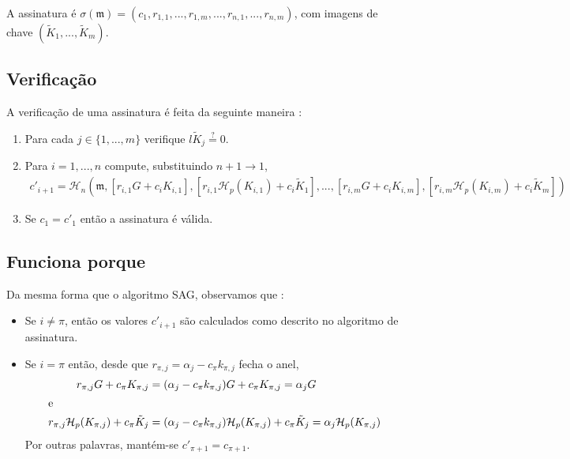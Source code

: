 \begin{description}
A assinatura é \(\sigma(\mathfrak{m}) = (c_1, r_{1, 1}, ..., r_{1, m}, ..., r_{n, 1}, ..., r_{n, m}) \), com imagens de chave $(\tilde{K}_1, ...,  \tilde{K}_m)$.



\subsection*{Verificação}

A verificação de uma assinatura é feita da seguinte maneira :

\begin{enumerate}
    \item Para cada $j \in \{1,...,m\}$ verifique $l \tilde{K}_j \stackrel{?}{=} 0$.
	\item Para \(i = 1, ..., n\) compute, substituindo \(n + 1 \rightarrow 1\),\vspace{.175cm}
	\begin{align*}
	c'_{i+1} = \mathcal{H}_n(\mathfrak{m}, [r_{i, 1} G + c_i K_{i, 1}], [r_{i, 1} \mathcal{H}_p(K_{i, 1}) + c_i \tilde{K}_1], 
	..., [r_{i, m} G + c_i K_{i, m}], [r_{i, m} \mathcal{H}_p(K_{i, m}) + c_i \tilde{K}_m])
	\end{align*}

	\item Se \(c_1 = c'_1\) então a assinatura é válida.
\end{enumerate}


\subsection*{Funciona porque}

Da mesma forma que o algoritmo SAG, observamos que :

\begin{itemize}
    \item Se \(i \ne \pi \), então os valores \(c'_{i + 1}\) são calculados como descrito no algoritmo de assinatura.

    \item Se \(i = \pi\) então, desde que \(r_{\pi, j} = \alpha_j - c_\pi k_{\pi, j} \) fecha o anel,\vspace{.175cm}
    \begin{alignat*}{6}
        r_{\pi, j} G + c_\pi K_{\pi,j} &= (\alpha_j - c_\pi k_{\pi, j}) G + c_\pi K_{\pi,j} = \alpha_j G\\
        \intertext{e}
        r_{\pi, j} \mathcal{H}_p(K_{\pi, j}) + c_\pi \tilde{K}_j &= (\alpha_j - c_\pi k_{\pi, j}) \mathcal{H}_p(K_{\pi, j}) + c_\pi \tilde{K}_j = \alpha_j \mathcal{H}_p(K_{\pi, j})\\
    \end{alignat*}
    Por outras palavras, mantém-se \(c'_{\pi + 1} = c_{\pi+1}\).
\end{itemize}



\end{description}
